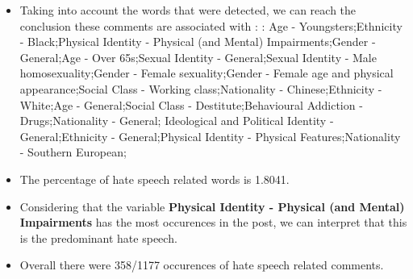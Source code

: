 \documentclass[11pt]{article}
\begin{document}
\begin{itemize}\item Taking into account the words that were detected, we can reach the conclusion these comments are associated with : : Age - Youngsters;Ethnicity - Black;Physical Identity - Physical (and Mental) Impairments;Gender - General;Age - Over 65s;Sexual Identity - General;Sexual Identity - Male homosexuality;Gender - Female sexuality;Gender - Female age and physical appearance;Social Class - Working class;Nationality - Chinese;Ethnicity - White;Age - General;Social Class - Destitute;Behavioural Addiction - Drugs;Nationality - General; Ideological and Political Identity - General;Ethnicity - General;Physical Identity - Physical Features;Nationality - Southern European;%

\item The percentage of hate speech related words is 1.8041.

\item Considering that the variable \textbf{Physical Identity - Physical (and Mental) Impairments} has the most occurences in the post, we can interpret that this is the predominant hate speech.

\item Overall there were 358/1177 occurences of hate speech related comments.\end{itemize}
\end{document}
